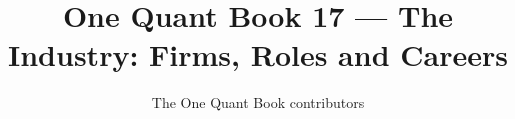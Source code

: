\documentclass[11pt,a4paper,twoside,openany]{book}
\title{One Quant Book 17 --- The Industry: Firms, Roles and Careers}
\author{The One Quant Book contributors}
\date{\bookdate}
\begin{document}
\frontmatter



\tableofcontents

\mainmatter


\appendix
\part{\omsolutionspart}


\backmatter
\printindex
\end{document}
